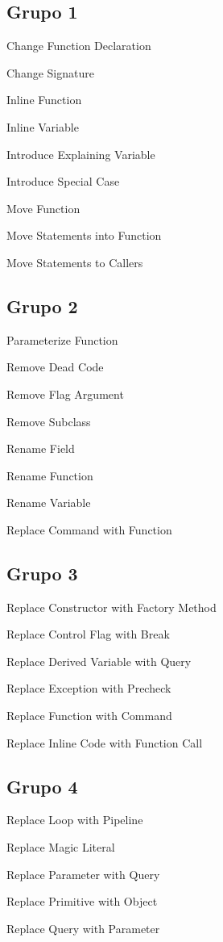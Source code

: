\documentclass[11pt,a4paper,oneside]{book}
\begin{document}
\subsection{Grupo 1}
Change Function Declaration

Change Signature 

Inline Function

Inline Variable

Introduce Explaining Variable

Introduce Special Case

Move Function

Move Statements into Function

Move Statements to Callers



\subsection{Grupo 2}
Parameterize Function

Remove Dead Code

Remove Flag Argument

Remove Subclass

Rename Field

Rename Function 

Rename Variable

Replace Command with Function

\subsection{Grupo 3}
Replace Constructor with Factory Method

Replace Control Flag with Break

Replace Derived Variable with Query

Replace Exception with Precheck

Replace Function with Command

Replace Inline Code with Function Call

\subsection{Grupo 4}
Replace Loop with Pipeline

Replace Magic Literal

Replace Parameter with Query

Replace Primitive with Object

Replace Query with Parameter
\end{document}
